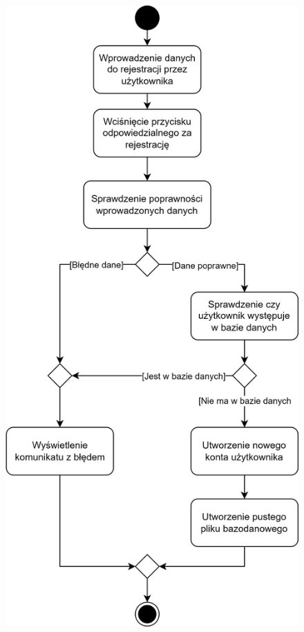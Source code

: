 \documentclass[12pt, a4paper]{article} %
\begin{document}
\begin{figure}
	\begin{minipage}{.5\textwidth}
	  \centering
	  \includegraphics[width=.8\textwidth]{images/diagramy_czynnosci/plan-diagram_czynnosci_rejestracja.png}
	  \label{rys:diagram_czynnosci_rejestracja}
	\end{minipage}
\end{figure}
\end{document}
